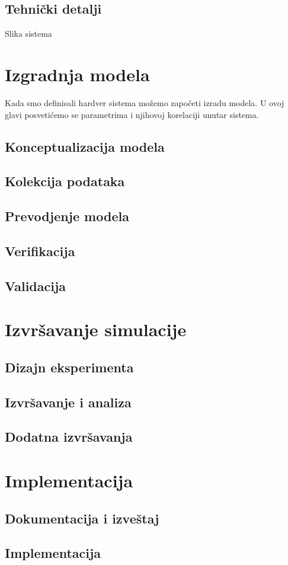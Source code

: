 \documentclass[a4paper,11pt]{book}
\begin{document}
\section{Tehnički detalji}

Slika sistema

\chapter{Izgradnja modela}

Kada smo definisali hardver sistema možemo započeti izradu modela. U ovoj glavi posvetićemo se parametrima i njihovoj korelaciji unutar sistema.

\section{Konceptualizacija modela}

\section{Kolekcija podataka}

\section{Prevodjenje modela}

\section{Verifikacija}

\section{Validacija}

\chapter{Izvršavanje simulacije}

\section{Dizajn eksperimenta}

\section{Izvršavanje i analiza}

\section{Dodatna izvršavanja}

\chapter{Implementacija}

\section{Dokumentacija i izveštaj}

\section{Implementacija}
\end{document}
